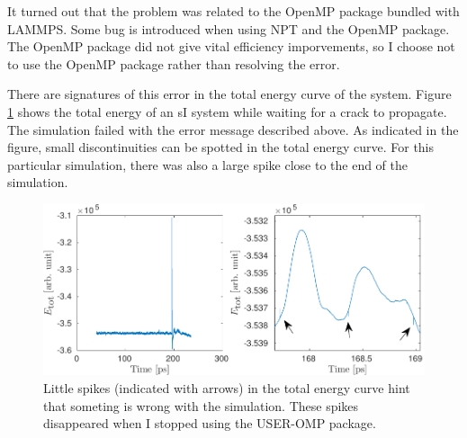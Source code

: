 It turned out that the problem was related to the OpenMP package bundled with LAMMPS. Some bug is introduced when using NPT and the OpenMP package. The OpenMP package did not give vital efficiency imporvements, so I choose not to use the OpenMP package rather than resolving the error.

There are signatures of this error in the total energy curve of the system. Figure \ref{fig:toteng_omp_bug} shows the total energy of an sI system while waiting for a crack to propagate. The simulation failed with the error message described above. As indicated in the figure, small discontinuities can be spotted in the total energy curve. For this particular simulation, there was also a large spike close to the end of the simulation. 

\begin{figure}
\centering
\includegraphics[width=\textwidth]{../figures/thesis/toteng_omp_bug.pdf}
\caption{Little spikes (indicated with arrows) in the total energy curve hint that someting is wrong with the simulation. These spikes disappeared when I stopped using the USER-OMP package.}
\label{fig:toteng_omp_bug}
\end{figure}
